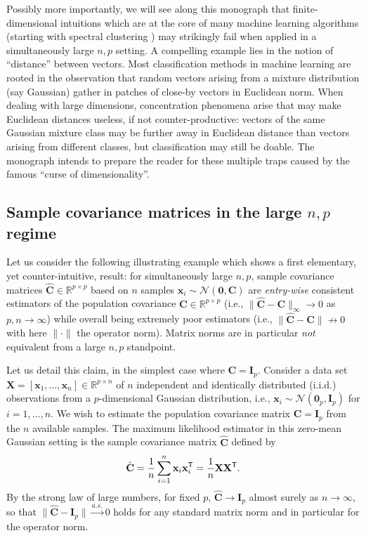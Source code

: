 \documentclass[MAL,biber]{nowfnt} %
\newcommand{\T}{{\sf T}}
\newcommand{\asto}{{ \xrightarrow{a.s.} }}
\newcommand{\C}{{\mathbf{C}}}
\newcommand{\I}{{\mathbf{I}}}
\newcommand{\X}{{\mathbf{X}}}
\newcommand{\x}{{\mathbf{x}}}
\newcommand{\zo}{{\mathbf{0}}}
\newcommand{\RR}{{\mathbb{R}}}
\newcommand{\NN}{{\mathcal{N}}}
\begin{document}
Possibly more importantly, we will see along this monograph that finite-dimensional intuitions which are at the core of many machine learning algorithms (starting with spectral clustering \citep{ng2002spectral,von2007tutorial}) may strikingly fail when applied in a simultaneously large $n,p$ setting. A compelling example lies in the notion of ``distance'' between vectors. Most classification methods in machine learning are rooted in the observation that random vectors arising from a mixture distribution (say Gaussian) gather in patches of close-by vectors in Euclidean norm. When dealing with large dimensions, concentration phenomena arise that may make Euclidean distances useless, if not counter-productive: vectors of the same Gaussian mixture class may be further away in Euclidean distance than vectors arising from different classes, but classification may still be doable. The monograph intends to prepare the reader for these multiple traps caused by the famous ``curse of dimensionality''.

\subsection{Sample covariance matrices in the large $n,p$ regime}
\label{sec:intro-SCM}

Let us consider the following illustrating example which shows a first elementary, yet counter-intuitive, result: for simultaneously large $n,p$, sample covariance matrices $\hat\C\in\RR^{p\times p}$ based on $n$ samples $\x_i\sim \NN(\zo,\C)$ are \emph{entry-wise} consistent estimators of the population covariance $\C\in\RR^{p\times p}$ (i.e., $\|\hat\C-\C\|_\infty\to 0$ as $p,n\to \infty$) while overall being extremely poor estimators (i.e., $\|\hat\C-\C\|\not\to 0$ with here $\|\cdot\|$ the operator norm). Matrix norms are in particular \emph{not} equivalent from a large $n,p$ standpoint. 

\medskip

Let us detail this claim, in the simplest case where $\C=\I_p$. Consider a data set $\X = [\x_1, \ldots, \x_n] \in \RR^{p \times n}$ of $n$ independent and identically distributed (i.i.d.\@) observations from a $p$-dimensional Gaussian distribution, i.e., $\x_i \sim \NN(\zo_p, \I_p)$ for $i=1,\ldots,n$. We wish to estimate the population covariance matrix $\C = \I_p$ from the $n$ available samples. The maximum likelihood estimator in this zero-mean Gaussian setting is the sample covariance matrix $\hat \C$ defined by
\begin{equation}\label{eq:scm}
    \hat \C = \frac1n \sum_{i=1}^n \x_i \x_i^\T = \frac1n \X \X^\T.
\end{equation}
By the strong law of large numbers, for fixed $p$, $\hat \C \to \I_p$ almost surely as $n \to \infty$, so that $\| \hat \C - \I_p \| \asto 0$ holds for any standard matrix norm and in particular for the operator norm. 
\end{document}
